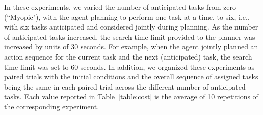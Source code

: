 In these experiments, we varied the number of anticipated tasks from zero (``Myopic"), with the agent planning to perform one task at a time, to six, i.e., with six tasks anticipated and considered jointly during planning. As the number of anticipated tasks increased, the search time limit provided to the planner was increased by units of 30 seconds. For example, when the agent jointly planned an action sequence for the current task and the next (anticipated) task, the search time limit was set to 60 seconds. In addition, we organized these experiments as paired trials with the initial conditions and the overall sequence of assigned tasks being the same in each paired trial across the different number of anticipated tasks. Each value reported in Table~\ref{table:cost} is the average of 10 repetitions of the corresponding experiment.


